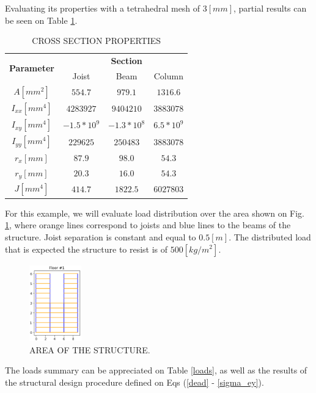 \documentclass[twocolumn,10pt]{asme2e}
\begin{document}
Evaluating its properties with a tetrahedral mesh of $3 [mm]$, partial results can be seen on Table \ref{properties}.

\begin{table}[t]
\centering
\caption{CROSS SECTION PROPERTIES}
\vspace{0.5cm}
\begin{tabular}{c | c c c}
\hline
\multirow{2}{*}{\textbf{Parameter}} & & \textbf{Section} \\  \cline{2-4}
 & Joist & Beam & Column \\ \hline
$A [mm^2]$ & $554.7$  & $979.1$  & $1316.6$  \\ \hline
$I_{xx} [mm^4]$ & $4283927$ & $9404210$ & $3883078$ \\ \hline
$I_{xy} [mm^4]$ & $-1.5*10^{9}$ & $-1.3*10^{8}$ & $6.5 * 10^{9}$ \\ \hline
$I_{yy} [mm^4]$ & $229625$ & $250483$ & $3883078$ \\ \hline
$r_x [mm]$ & $87.9$ & $98.0$ & $54.3$ \\ \hline
$r_y [mm]$ & $20.3$ & $16.0$ & $54.3$ \\ \hline
$J [mm^4]$ & $414.7$ & $1822.5$ & $6027803$ \\ \hline
\end{tabular}
\label{properties}
\end{table}

For this example, we will evaluate load distribution over the area shown on Fig. \ref{DistArea}, where orange lines correspond to joists and blue lines to the beams of the structure. Joist separation is constant and equal to $0.5 [m]$. The distributed load that is expected the structure to resist is of $500 [kg / m^2]$.

\begin{figure}[t]
\centering
\includegraphics[width=0.2\textwidth]{Images/area.PNG}
\caption{AREA OF THE STRUCTURE.}
\label{DistArea}
\end{figure} 

The loads summary can be appreciated on Table \ref{loads}, as well as the results of the structural design procedure defined on Eqs (\ref{dead} - \ref{sigma_ey}).
\end{document}
